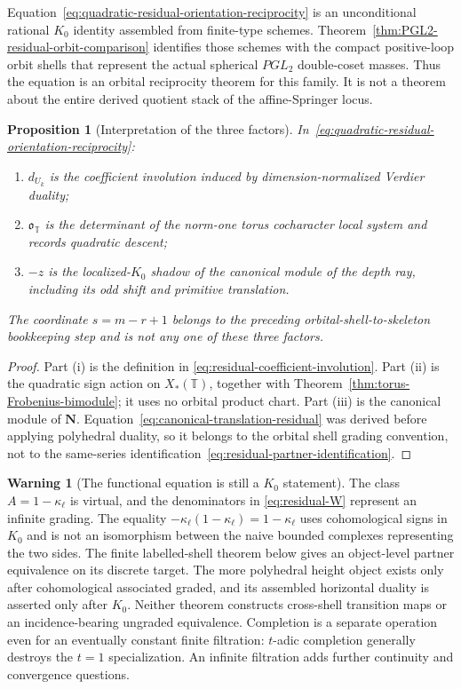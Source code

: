 \documentclass[11pt]{article}
\newtheorem{proposition}[theorem]{Proposition}
\theoremstyle{definition}
\newtheorem{warning}[theorem]{Warning}
\theoremstyle{remark}
\newcommand{\Uk}{U_k}
\newcommand{\kappaell}{\kappa_{\ell}}
\begin{document}
Equation~\eqref{eq:quadratic-residual-orientation-reciprocity} is an
unconditional rational $K_0$ identity assembled from finite-type schemes.
Theorem~\ref{thm:PGL2-residual-orbit-comparison} identifies those schemes with
the compact positive-loop orbit shells that represent the actual spherical
$PGL_2$ double-coset masses.  Thus the equation is an orbital reciprocity
theorem for this family.  It is not a theorem about the entire derived quotient
stack of the affine-Springer locus.

\begin{proposition}[Interpretation of the three factors]
In~\eqref{eq:quadratic-residual-orientation-reciprocity}:
\begin{enumerate}[label=\textup{(\roman*)}]
\item $d_{\Uk}$ is the coefficient involution induced by dimension-normalized
  Verdier duality;
\item $\mathfrak o_{\mathbb T}$ is the determinant of the norm-one torus
  cocharacter local system and records quadratic descent;
\item $-z$ is the localized-$K_0$ shadow of the canonical module of the depth
  ray, including its odd shift and primitive translation.
\end{enumerate}
The coordinate $s=m-r+1$ belongs to the preceding orbital-shell-to-skeleton
bookkeeping step
and is not any one of these three factors.
\end{proposition}

\begin{proof}
Part (i) is the definition in
\eqref{eq:residual-coefficient-involution}.  Part (ii) is the quadratic sign
action on $X_*(\mathbb T)$, together with
Theorem~\ref{thm:torus-Frobenius-bimodule}; it uses no orbital product chart.
Part (iii) is the canonical module of $\mathbf N$.
Equation~\eqref{eq:canonical-translation-residual} was derived before applying
polyhedral duality, so it belongs to the orbital shell grading convention, not to the same-series
identification~\eqref{eq:residual-partner-identification}.
\end{proof}

\begin{warning}[The functional equation is still a $K_0$ statement]
The class $A=1-\kappaell$ is virtual, and the denominators in
\eqref{eq:residual-W} represent an infinite grading.  The equality
$-\kappaell(1-\kappaell)=1-\kappaell$ uses cohomological signs in $K_0$ and is not an
isomorphism between the naive bounded complexes representing the two sides.
The finite labelled-shell theorem below gives an object-level partner
equivalence on its discrete target.  The more polyhedral height object exists
only after cohomological associated graded, and its assembled horizontal
duality is asserted only after $K_0$.  Neither theorem constructs cross-shell
transition maps or an incidence-bearing ungraded equivalence.  Completion is
a separate operation even for an eventually constant finite filtration:
$t$-adic completion generally destroys the $t=1$ specialization.  An infinite
filtration adds further continuity and convergence questions.
\end{warning}
\end{document}
